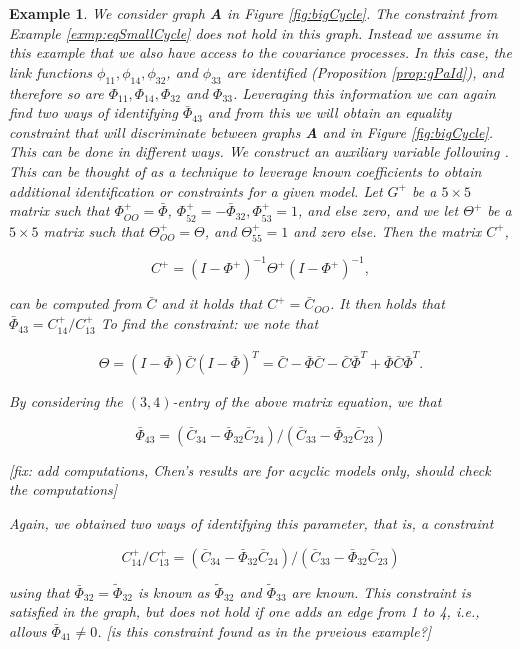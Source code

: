 \documentclass[accepted]{uai2021} %
\newtheorem{exmp}[thm]{Example}
\begin{document}
\begin{exmp}
	We consider graph \textbf{A} in Figure \ref{fig:bigCycle}. The constraint 
	from Example \ref{exmp:eqSmallCycle} does not hold in this graph. Instead 
	we assume in 
	this example that we also have access to the 
	covariance processes. In this case, the link functions 
	$\phi_{11},\phi_{14},\phi_{32}$, and $\phi_{33}$ are identified 
	(Proposition 
	\ref{prop:gPaId}), and therefore so are $\Phi_{11}, \Phi_{14} , \Phi_{32}$ 
	and 
	$\Phi_{33}$.  Leveraging this information we can again find two ways of 
	identifying 
	$\bar{\Phi}_{43}$ and from this we will obtain an equality constraint that 
	will 
	discriminate between graphs \textbf{A} and  in 
	Figure \ref{fig:bigCycle}. This can be done in different ways. We 
	construct an {\it auxiliary 
	variable} following \cite{chenIJCAI2016, chenICML2017}. This can be thought 
	of as a technique to leverage known coefficients to obtain additional 
	identification or constraints for a given model. Let $G^+$ be a 
	$5\times 5$ 
	matrix such that $\Phi_{OO}^+ = \bar{\Phi}$, $\Phi_{52}^+ = 
	-\bar{\Phi}_{32}, \Phi_{53}^+ 
	= 1$, and else zero, and we let $\Theta^+$ be a $5\times 5$ matrix such 
	that $\Theta_{OO}^+ = \Theta$, and $\Theta_{55}^+ = 1$ and zero else. Then 
	the matrix $C^+$,
	
	$$
	C^+ = (I - \Phi^+)^{-1}\Theta^+(I-\Phi^+)^{-1},
	$$
	
	can be computed from $\bar{C}$ and it holds that 
	$C^+=\bar{C}_{OO}$. It then holds that $\bar{\Phi}_{43} = 
	C_{14}^+/C_{13}^+$
	To find the constraint: we note that
	
	\begin{align}
		\Theta = (I - \bar{\Phi})\bar{C}(I-\bar{\Phi})^T = \bar{C} - 
		\bar{\Phi}\bar{C} - \bar{C}\bar{\Phi}^T + 
		\bar{\Phi}\bar{C}\bar{\Phi}^T.
		\label{eq:expandTheta}
	\end{align}

	
	By considering the $(3,4)$-entry of the above matrix equation, we that
	
	$$
	\bar{\Phi}_{43} = (\bar{C}_{34} - 
	\bar{\Phi}_{32}\bar{C}_{24})/(\bar{C}_{33} - 
	\bar{\Phi}_{32}\bar{C}_{23})
	$$
	
	[fix: add computations, Chen's results are for acyclic models only, should 
	check the computations]
	
	
 Again, we obtained two ways of identifying 
 this parameter, that is, a constraint
 
 $$
 C_{14}^+/C_{13}^+ = (\bar{C}_{34} - 
 \bar{\Phi}_{32}\bar{C}_{24})/(\bar{C}_{33} - 
 \bar{\Phi}_{32}\bar{C}_{23})
 $$
 
 using that $\bar{\Phi}_{32} = \tilde{\Phi}_{32}$ is known as 
 $\tilde{\Phi}_{32}$ and 
 $\tilde{\Phi}_{33}$ are known. This constraint is satisfied in the graph, 
 but 
 does not hold if one adds an edge from 1 to 
 4, i.e., allows $\bar{\Phi}_{41} \neq 0$. [is this constraint found as in 
 the 
 prveious example?]
\end{exmp}
\end{document}
